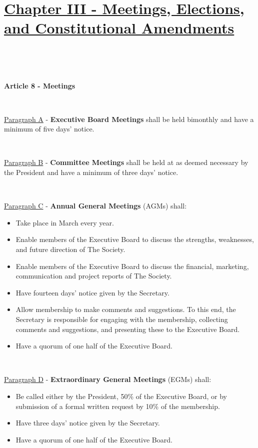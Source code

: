 \section{\underline{Chapter III - Meetings, Elections, and Constitutional Amendments}}

~

~

\large{\textbf{Article 8 - Meetings}}

~

\underline{Paragraph A} - \textbf{Executive Board Meetings} shall be
held bimonthly and have a minimum of five days' notice.

~

\underline{Paragraph B} - \textbf{Committee Meetings} shall be
held at as deemed necessary by the President and have a minimum of three days' notice.

~

\underline{Paragraph C} - \textbf{Annual General Meetings} (AGMs) shall:

\begin{itemize}

    \item{Take place in March every year.}

    \item{Enable members of the Executive Board to discuss the strengths, weaknesses, and future direction of The Society.}

    \item{Enable members of the Executive Board to discuss the financial, marketing, communication and project reports of The Society.}

    \item{Have fourteen days' notice given by the Secretary.}

    \item{Allow membership to make comments and suggestions. To this end, the Secretary is responsible for engaging with the membership, collecting comments and suggestions, and presenting these to the Executive Board.}

    \item{Have a quorum of one half of the Executive Board.}

\end{itemize}

~

\underline{Paragraph D} - \textbf{Extraordinary General Meetings} (EGMs)
shall:

\begin{itemize}

    \item{Be called either by the President, 50\% of the Executive Board, or by submission of a formal written request by 10\% of the membership.}

    \item{Have three days' notice given by the Secretary.}

    \item{Have a quorum of one half of the Executive Board.}

\end{itemize}

